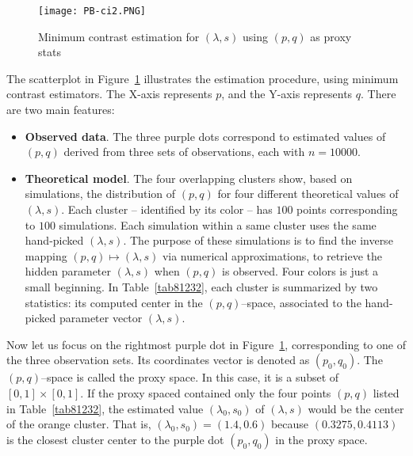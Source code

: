 \documentclass[oneside,10pt]{book}
\begin{document}
\begin{figure}[H]
\centering
\texttt{[image: PB-ci2.PNG]}  %
\caption{Minimum contrast estimation for $(\lambda,s)$ using $(p,q)$ as proxy stats}
\label{fig:pbcixzas}
\end{figure}

\noindent The scatterplot in Figure~\ref{fig:pbcixzas} illustrates the estimation procedure, using minimum contrast estimators. The X-axis represents $p$, and the Y-axis represents $q$. There are two main features: \vspace{1ex}
\begin{itemize}
\item {\bf Observed data}. The three purple dots correspond to estimated values of $(p,q)$ derived from three  sets of observations,  each with $n=\num{10000}$. 

\item {\bf Theoretical model}. The four overlapping clusters show, based on simulations, the distribution of $(p,q)$ for four different theoretical values
of $(\lambda,s)$. Each cluster -- identified by its color -- has $100$ points corresponding to $100$ simulations. Each simulation within a same cluster uses 
the same hand-picked $(\lambda,s)$.  The purpose of these simulations is to find the inverse mapping $(p, q) \mapsto (\lambda,s)$
via numerical approximations, to retrieve the hidden parameter $(\lambda,s)$ when $(p,q)$ is observed. Four colors is just a small beginning. In  Table~\ref{tab81232}, each cluster is summarized by two statistics: its computed center in the $(p,q)$--space, associated to the hand-picked parameter vector $(\lambda,s)$.
\end{itemize}\vspace{1ex}


\noindent Now let us focus on the rightmost purple dot in Figure~\ref{fig:pbcixzas}, corresponding to one of the three observation sets. Its coordinates vector 
 is denoted as $(p_0,q_0)$.
The $(p,q)$--space is called the \textcolor{index}{proxy space}. In this case, it is a subset of $[0,1]\times [0,1]$. If
the proxy spaced contained only the four points $(p,q)$ listed in Table~\ref{tab81232}, the estimated value $(\lambda_0,s_0)$ of $(\lambda,s)$ would be the center of the orange cluster.  That is, $(\lambda_0,s_0)=(1.4, 0.6)$ because $(0.3275,0.4113)$  is the closest cluster center to the purple dot $(p_0,q_0)$ in the proxy space. 
\end{document}
